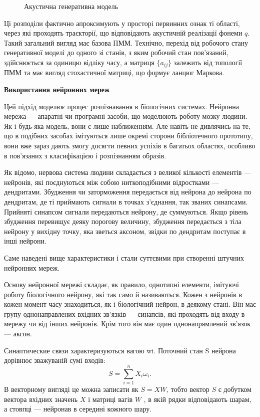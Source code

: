 \documentclass{diploma}
\begin{document}
\begin{figure}[h]
\noindent
{}
\caption{Акустична генеративна модель}\label{acusticmodel}
\end{figure}

Ці розподіли фактично апроксимують у просторі первинних ознак ті області, через які проходять траєкторії, що відповідають акустичній реалізації фонеми $q$. Такий загальний вигляд має базова ПММ. Технічно, перехід від робочого стану генеративної моделі до одного зі станів, з яким робочий стан пов’язаний, здійснюється за одиницю відліку часу, а матриця $\{a_{ij}\}$ залежить від топології ПММ та має вигляд стохастичної матриці, що формує ланцюг Маркова.~\cite{l2}


\textbf{Використання нейронних мереж}

Цей підхід моделює процес розпізнавання в біологічних системах. Нейронна мережа --- апаратні чи програмні засоби, що моделюють роботу мозку людини. Як і будь-яка модель, вони є лише наближенням. Але навіть не дивлячись на те, що в подібних засобах імітуються лише окремі сторони бібліотечного прототипу, вони вже зараз дають змогу досягти певних успіхів в багатьох областях, особливо в пов'язаних з класифікацією і розпізнанням образів.

Як відомо, нервова система людини складається з великої кількості елементів --- нейронів, які поєднуються між собою ниткоподібними відростками --- дендритами. Збудження чи заторможення передається від нейрона до нейрона по дендритам, де ті приймають сигнали в точках з'єднання, так званих синапсами. Прийняті синапсом сигнали передаються нейрону, де суммуються. Якщо рівень збудження перевищує деяку порогову величину, збудження передається з тіла нейрону у вихідну точку, яка зветься аксоном, звідки по дендритам поступає в інші нейрони.

Саме наведені вище характеристики і стали суттєвими при створенні штучних нейронних мереж.

Основу нейронної мережі складає, як правило, однотипні елементи, імітуючі роботу біологічного нейрону, які так само й називаються. Кожен з нейронів в кожен момент часу знаходиться, як і біологічний нейрон, в деякому стані. Він має групу однонаправлених вхідних зв'язків --- синапсів, які проходять від входу в мережу чи від інших нейронів. Крім того він має один однонапрямлений зв'язок --- аксон.

Синаптические связи характеризуються вагою wi. Поточний стан S нейрона дорівнює зважуваній сумі входів: $$S = \sum_{i=1}^{n}X_i\omega_i.$$
В векторному вигляді це можна записати як $S = XW$, тобто вектор $S$ є добутком вектора вхідних значень $X$ і матриці вагів $W$ , в якій рядки відповідають шарам, а стовпці --- нейронав в середині кожного шару.
\end{document}
